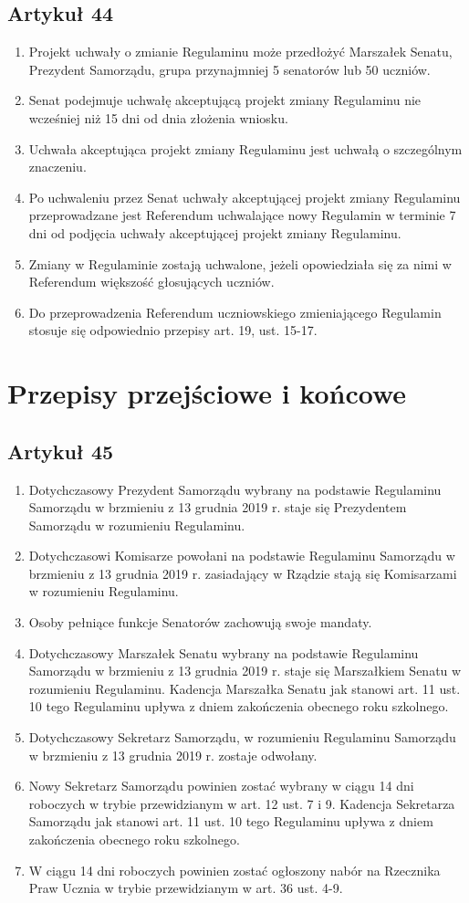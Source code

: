 \documentclass[14pt]{article}
\newenvironment{ustepy}{%
	\begin{enumerate}[leftmargin=1.5em, itemindent=1pt, labelwidth=1em, itemsep=5pt]
	}{%
	\end{enumerate}
}
\begin{document}
\subsection*{Artykuł 44}
\begin{ustepy}
	\item Projekt uchwały o zmianie Regulaminu może przedłożyć Marszałek Senatu, Prezydent Samorządu, grupa przynajmniej 5 senatorów lub 50 uczniów.
	\item Senat podejmuje uchwałę akceptującą projekt zmiany Regulaminu nie wcześniej niż 15 dni od dnia złożenia wniosku.
	\item Uchwała akceptująca projekt zmiany Regulaminu jest uchwałą o szczególnym znaczeniu.
	\item Po uchwaleniu przez Senat uchwały akceptującej projekt zmiany Regulaminu przeprowadzane jest Referendum uchwalające nowy Regulamin w terminie 7 dni od podjęcia uchwały akceptującej projekt zmiany Regulaminu.
	\item Zmiany w Regulaminie zostają uchwalone, jeżeli opowiedziała się za nimi w Referendum większość głosujących uczniów.
	\item Do przeprowadzenia Referendum uczniowskiego zmieniającego Regulamin stosuje się odpowiednio przepisy art. 19, ust. 15-17.
\end{ustepy}
\section{Przepisy przejściowe i końcowe}
\subsection*{Artykuł 45}
\begin{ustepy}
	\item Dotychczasowy Prezydent Samorządu wybrany na podstawie Regulaminu Samorządu w brzmieniu z 13 grudnia 2019 r. staje się Prezydentem Samorządu w rozumieniu Regulaminu.
	\item Dotychczasowi Komisarze powołani na podstawie Regulaminu Samorządu w brzmieniu z 13 grudnia 2019 r. zasiadający w Rządzie stają się Komisarzami w rozumieniu Regulaminu.
	\item Osoby pełniące funkcje Senatorów zachowują swoje mandaty.
	\item Dotychczasowy Marszałek Senatu wybrany na podstawie Regulaminu Samorządu w brzmieniu z 13 grudnia 2019 r. staje się Marszałkiem Senatu w rozumieniu Regulaminu. Kadencja Marszałka Senatu jak stanowi art. 11 ust. 10 tego Regulaminu upływa z dniem zakończenia obecnego roku szkolnego.
	\item Dotychczasowy Sekretarz Samorządu, w rozumieniu Regulaminu Samorządu w brzmieniu z 13 grudnia 2019 r. zostaje odwołany.
	\item Nowy Sekretarz Samorządu powinien zostać wybrany w ciągu 14 dni roboczych w trybie przewidzianym w art. 12 ust. 7 i 9. Kadencja Sekretarza Samorządu jak stanowi art. 11 ust. 10 tego Regulaminu upływa z dniem zakończenia obecnego roku szkolnego.
	\item W ciągu 14 dni roboczych powinien zostać ogłoszony nabór na Rzecznika Praw Ucznia w trybie przewidzianym w art. 36 ust. 4-9.
\end{ustepy}
\end{document}
